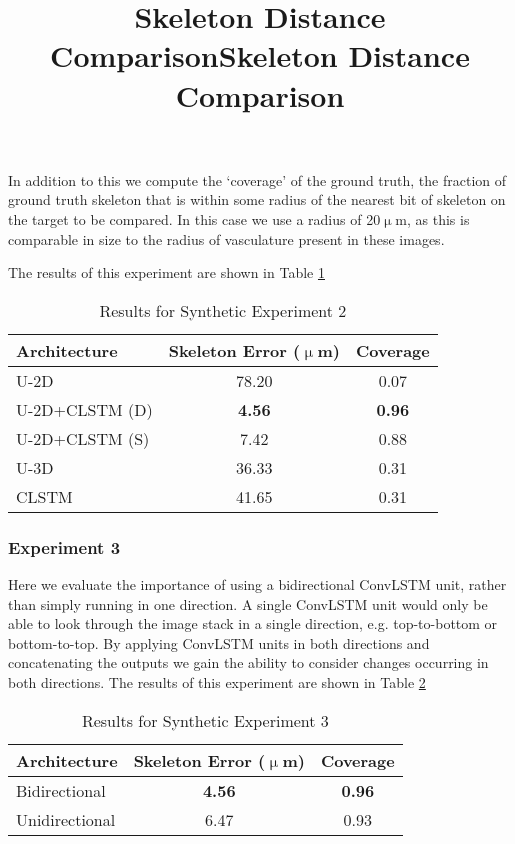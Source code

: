 \documentclass[journal,transmag]{IEEEtran}
\begin{document}
In addition to this we compute the `coverage' of the ground truth, the fraction of ground truth skeleton that is within some radius of the nearest bit of skeleton on the target to be compared. In this case we use a radius of 20$\upmu$m, as this is comparable in size to the radius of vasculature present in these images.

The results of this experiment are shown in Table \ref{tab:synth_skel_haus}

\begin{table}[h]
\title{Skeleton Distance Comparison}
\centering
\begin{tabular}{l|c|c}
Architecture & Skeleton Error ($\upmu$m)  & Coverage \\
\hline
U-2D & 78.20 & 0.07 \\
U-2D+CLSTM (D) & \textbf{4.56}  & \textbf{0.96} \\
U-2D+CLSTM (S) & 7.42  & 0.88 \\
U-3D &  36.33  & 0.31 \\
CLSTM & 41.65  & 0.31 \\
\end{tabular}
\caption{Results for Synthetic Experiment 2}
\label{tab:synth_skel_haus}
\end{table}

\subsubsection*{Experiment 3}
Here we evaluate the importance of using a bidirectional ConvLSTM unit, rather than simply running in one direction. A single ConvLSTM unit would only be able to look through the image stack in a single direction, e.g. top-to-bottom or bottom-to-top. By applying ConvLSTM units in both directions and concatenating the outputs we gain the ability to consider changes occurring in both directions. The results of this experiment are shown in Table \ref{tab:bidirectional}

\begin{table}[h]
\title{Skeleton Distance Comparison}
\centering
\begin{tabular}{l|c|c}
Architecture & Skeleton Error ($\upmu$m)  & Coverage\\
\hline
Bidirectional & \textbf{4.56} & \textbf{0.96}  \\
Unidirectional & 6.47  & 0.93  \\
\end{tabular}
\caption{Results for Synthetic Experiment 3}
\label{tab:bidirectional}
\end{table}
\end{document}
